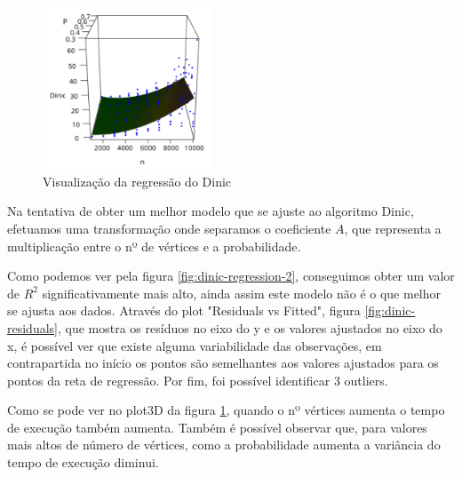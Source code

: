 \documentclass{uofa-eng-assignment}
\begin{document}
\begin{figure}
\centering
\includegraphics[width=0.45\textwidth]{plot3d_dinic.png}
\caption{Visualização da regressão do Dinic}
\label{fig:plot3d-dinic}
\end{figure}

Na tentativa de obter um melhor modelo que se ajuste ao algoritmo Dinic, efetuamos uma transformação onde separamos o coeficiente $A$, que representa a multiplicação entre o nº de vértices e a probabilidade.

Como podemos ver pela figura \ref{fig:dinic-regression-2}, conseguimos obter um valor de $R^2$ significativamente mais alto, ainda assim este modelo não é o que melhor se ajusta aos dados.
Através do plot "Residuals vs Fitted", figura \ref{fig:dinic-residuals}, que mostra os resíduos no eixo do y e os valores ajustados no eixo do x, é possível ver que existe alguma variabilidade das observações, em contrapartida no início os pontos são semelhantes aos valores ajustados para os pontos da reta de regressão. Por fim, foi possível identificar 3 outliers.

Como se pode ver no plot3D da figura \ref{fig:plot3d-dinic}, quando o nº vértices aumenta o tempo de execução também aumenta. Também é possível observar que, para valores mais altos de número de vértices, como a probabilidade aumenta a variância do tempo de execução diminui.
\end{document}
